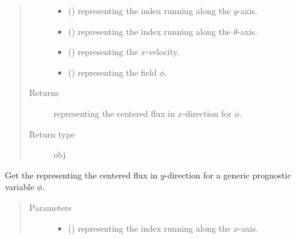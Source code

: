 \documentclass[letterpaper,10pt,english]{sphinxmanual}
\begin{document}
\begin{fulllineitems}
\begin{fulllineitems}
\begin{quote}
\begin{description}
\begin{itemize}
\item {} 
 () \textendash{}  representing the index running along the \(y\)-axis.

\item {} 
 () \textendash{}  representing the index running along the \(\theta\)-axis.

\item {} 
 () \textendash{}  representing the \(x\)-velocity.

\item {} 
 () \textendash{}  representing the field \(\phi\).

\end{itemize}

\item[{Returns}] \leavevmode
{} representing the centered flux in \(x\)-direction for \(\phi\).

\item[{Return type}] \leavevmode
obj

\end{description}\end{quote}

\end{fulllineitems}


\begin{fulllineitems}
\label{\detokenize{api:tasmania.dycore.flux_isentropic_centered.FluxIsentropicCentered._get_centered_flux_y}}
Get the  representing the centered flux in \(y\)-direction
for a generic prognostic variable \(\phi\).
\begin{quote}\begin{description}
\item[{Parameters}] \leavevmode\begin{itemize}
\item {} 
 () \textendash{}  representing the index running along the \(x\)-axis.


\end{itemize}
\end{description}
\end{quote}
\end{fulllineitems}
\end{fulllineitems}
\end{document}
